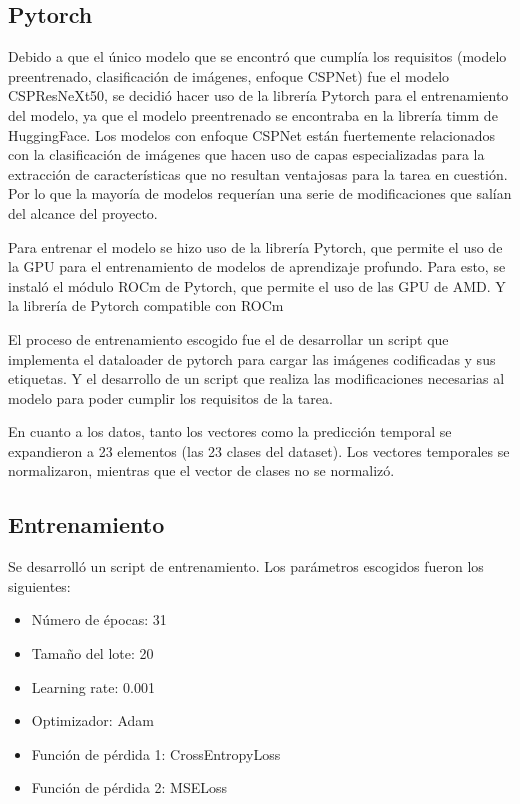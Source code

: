 \subsection{Pytorch}
Debido a que el único modelo que se encontró que cumplía los requisitos (modelo preentrenado, clasificación de imágenes, enfoque CSPNet) fue el modelo CSPResNeXt50, se decidió hacer uso de la librería Pytorch para el entrenamiento del modelo, ya que el modelo preentrenado se encontraba en la librería timm de HuggingFace.
Los modelos con enfoque CSPNet están fuertemente relacionados con la clasificación de imágenes que hacen uso de capas especializadas para la extracción de características que no resultan ventajosas para la tarea en cuestión. Por lo que la mayoría de modelos requerían una serie de modificaciones que salían del alcance del proyecto.

Para entrenar el modelo se hizo uso de la librería Pytorch, que permite el uso de la GPU para el entrenamiento de modelos de aprendizaje profundo.
Para esto, se instaló el módulo ROCm de Pytorch, que permite el uso de las GPU de AMD. Y la librería de Pytorch compatible con ROCm

El proceso de entrenamiento escogido fue el de desarrollar un script que implementa el dataloader de pytorch para cargar las imágenes codificadas y sus etiquetas. Y el desarrollo de un script que realiza las modificaciones necesarias al modelo para poder cumplir los requisitos de la tarea.  

En cuanto a los datos, tanto los vectores como la predicción temporal se expandieron a 23 elementos (las 23 clases del dataset). Los vectores temporales se normalizaron, mientras que el vector de clases no se normalizó.



\subsection{Entrenamiento}
Se desarrolló un script de entrenamiento. Los parámetros escogidos fueron los siguientes:
\begin{itemize}
    \item Número de épocas: 31
    \item Tamaño del lote: 20
    \item Learning rate: 0.001
    \item Optimizador: Adam
    \item Función de pérdida 1: CrossEntropyLoss
    \item Función de pérdida 2: MSELoss
\end{itemize}

